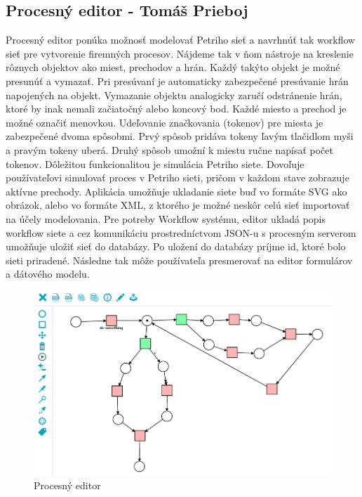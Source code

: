 \subsection{Procesný editor - Tomáš Prieboj}
Procesný editor ponúka možnosť modelovať Petriho sieť a navrhnúť tak workflow sieť pre vytvorenie firemných procesov. Nájdeme tak v ňom nástroje na kreslenie rôznych objektov ako miest, prechodov a hrán. Každý takýto objekt je možné presunúť a vymazať. Pri presúvaní je automaticky zabezpečené presúvanie hrán napojených na objekt. Vymazanie objektu analogicky zaručí odstránenie hrán, ktoré by inak nemali začiatočný alebo koncový bod. Každé miesto a prechod je možné označiť menovkou. Udeľovanie značkovania (tokenov) pre miesta je zabezpečené dvoma spôsobmi. Prvý spôsob pridáva tokeny ľavým tlačidlom myši a  pravým tokeny uberá. Druhý spôsob umožní k miestu ručne napísať počet tokenov. Dôležitou funkcionalitou je simulácia Petriho siete. Dovoľuje používateľovi simulovať proces v Petriho sieti, pričom v každom stave zobrazuje aktívne prechody. Aplikácia umožňuje ukladanie siete buď vo formáte SVG ako obrázok, alebo vo formáte XML, z ktorého je možné neskôr celú sieť importovať na účely modelovania. Pre potreby Workflow systému, editor ukladá popis workflow siete a cez komunikáciu prostredníctvom JSON-u s procesným serverom umožňuje uložiť sieť do databázy. Po uložení do databázy príjme id, ktoré bolo sieti priradené. Následne tak môže používateľa presmerovať na editor formulárov a dátového modelu.

\begin{figure}[h]
	\centering
	\includegraphics[width=0.7\linewidth]{images/tomas}
	\caption{Procesný editor}
	\label{fig:Procesný editor}
\end{figure}



